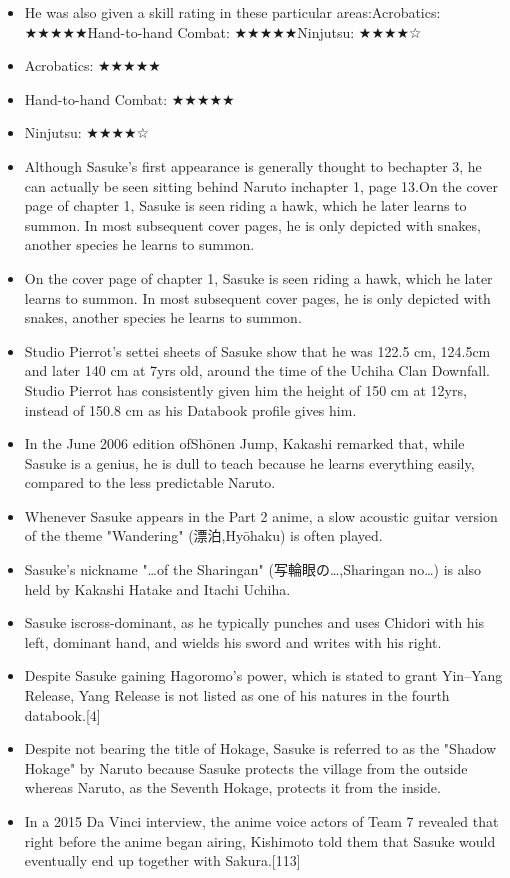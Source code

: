\documentclass[a4paper,12pt]{article}
\begin{document}
\begin{itemize}
\item He was also given a skill rating in these particular areas:Acrobatics: ★★★★★Hand-to-hand Combat: ★★★★★Ninjutsu: ★★★★☆
\item Acrobatics: ★★★★★
\item Hand-to-hand Combat: ★★★★★
\item Ninjutsu: ★★★★☆
\item Although Sasuke's first appearance is generally thought to bechapter 3, he can actually be seen sitting behind Naruto inchapter 1, page 13.On the cover page of chapter 1, Sasuke is seen riding a hawk, which he later learns to summon. In most subsequent cover pages, he is only depicted with snakes, another species he learns to summon.
\item On the cover page of chapter 1, Sasuke is seen riding a hawk, which he later learns to summon. In most subsequent cover pages, he is only depicted with snakes, another species he learns to summon.
\item Studio Pierrot's settei sheets of Sasuke show that he was 122.5 cm, 124.5cm and later 140 cm at 7yrs old, around the time of the Uchiha Clan Downfall. Studio Pierrot has consistently given him the height of 150 cm at 12yrs, instead of 150.8 cm as his Databook profile gives him.
\item In the June 2006 edition ofShōnen Jump, Kakashi remarked that, while Sasuke is a genius, he is dull to teach because he learns everything easily, compared to the less predictable Naruto.
\item Whenever Sasuke appears in the Part 2 anime, a slow acoustic guitar version of the theme "Wandering" (漂泊,Hyōhaku) is often played.
\item Sasuke's nickname "…of the Sharingan" (写輪眼の…,Sharingan no…) is also held by Kakashi Hatake and Itachi Uchiha.
\item Sasuke iscross-dominant, as he typically punches and uses Chidori with his left, dominant hand, and wields his sword and writes with his right.
\item Despite Sasuke gaining Hagoromo's power, which is stated to grant Yin–Yang Release, Yang Release is not listed as one of his natures in the fourth databook.[4]
\item Despite not bearing the title of Hokage, Sasuke is referred to as the "Shadow Hokage" by Naruto because Sasuke protects the village from the outside whereas Naruto, as the Seventh Hokage, protects it from the inside.
\item In a 2015 Da Vinci interview, the anime voice actors of Team 7 revealed that right before the anime began airing, Kishimoto told them that Sasuke would eventually end up together with Sakura.[113]

\end{itemize}
\end{document}
